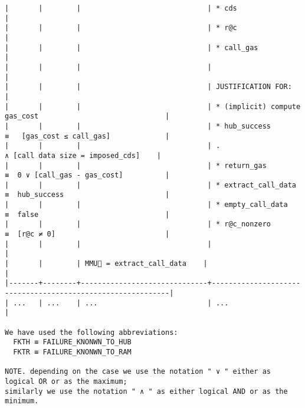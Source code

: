 \documentclass[varwidth=\maxdimen,margin=0.5cm,multi={verbatim}]{standalone}
\begin{document}
\begin{verbatim}
|       |        |                              | * cds                                                      |
|       |        |                              | * r@c                                                      |
|       |        |                              | * call_gas                                                 |
|       |        |                              |                                                            |
|       |        |                              | JUSTIFICATION FOR:                                         |
|       |        |                              | * (implicit) compute gas_cost                              |
|       |        |                              | * hub_success        ≡   [gas_cost ≤ call_gas]             |
|       |        |                              | .                      ∧ [call data size = imposed_cds]    |
|       |        |                              | * return_gas         ≡  0 ∨ [call_gas - gas_cost]          |
|       |        |                              | * extract_call_data  ≡  hub_success                        |
|       |        |                              | * empty_call_data    ≡  false                              |
|       |        |                              | * r@c_nonzero        ≡  [r@c ≠ 0]                          |
|       |        |                              |                                                            |
|       |        | MMU🏴 = extract_call_data    |                                                            |
|-------+--------+------------------------------+------------------------------------------------------------|
| ...   | ...    | ...                          | ...                                                        |

We have used the following abbreviations:
  FKTH ≡ FAILURE_KNONWN_TO_HUB
  FKTR ≡ FAILURE_KNONWN_TO_RAM

NOTE. depending on the case we use the notation " ∨ " either as logical OR or as the maximum;
similarly we use the notation " ∧ " as either logical AND or as the minimum.
\end{verbatim}
\end{document}
